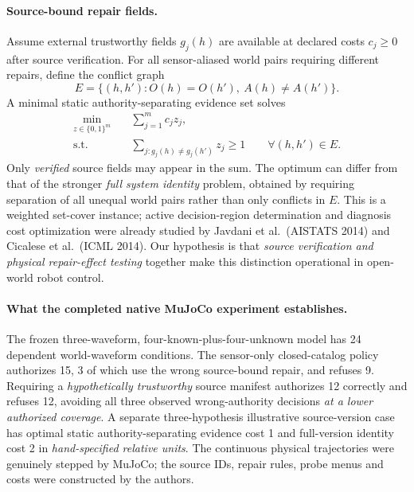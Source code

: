 \paragraph{Source-bound repair fields.}
Assume external trustworthy fields $g_j(h)$ are available at declared
costs $c_j\ge 0$ after source verification. For all sensor-aliased
world pairs requiring different repairs, define the conflict graph
\[
E=\{(h,h'):O(h)=O(h'),\ A(h)\ne A(h')\}.
\]
A minimal static authority-separating evidence set solves
\begin{align}
\min_{z\in\{0,1\}^{m}}&\quad \sum_{j=1}^m c_jz_j,\\
\textrm{s.t.}&\quad
\sum_{j:g_j(h)\ne g_j(h')}z_j\ge 1
\qquad \forall(h,h')\in E. \label{eq:provenance-cover}
\end{align}
Only \emph{verified} source fields may appear in the sum. The optimum
can differ from that of the stronger \emph{full system identity}
problem, obtained by requiring separation of all unequal world pairs
rather than only conflicts in $E$. This is a weighted set-cover
instance; active decision-region determination and diagnosis cost
optimization were already studied by Javdani et al.\ (AISTATS 2014)
and Cicalese et al.\ (ICML 2014). Our hypothesis is that
\emph{source verification and physical repair-effect testing} together
make this distinction operational in open-world robot control.

\paragraph{What the completed native MuJoCo experiment establishes.}
The frozen three-waveform, four-known-plus-four-unknown model has 24
dependent world-waveform conditions. The sensor-only closed-catalog
policy authorizes 15, 3 of which use the wrong source-bound repair,
and refuses 9. Requiring a \emph{hypothetically trustworthy} source
manifest authorizes 12 correctly and refuses 12, avoiding all three
observed wrong-authority decisions \emph{at a lower authorized
coverage}. A separate three-hypothesis illustrative source-version
case has optimal static authority-separating evidence cost 1 and
full-version identity cost 2 in \emph{hand-specified relative units}.
The continuous physical trajectories were genuinely stepped by
MuJoCo; the source IDs, repair rules, probe menus and costs were
constructed by the authors.

